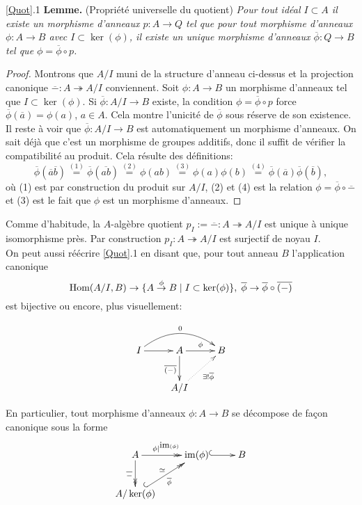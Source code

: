 \documentclass[a4paper, oneside, 12pt]{book}
\theoremstyle{definition} %
\DeclareMathOperator{\im}{im}
\begin{document}
 \ref{Quot}.1 \textbf{Lemme.} (Propriété universelle du quotient) \textit{Pour tout idéal $I\subset A$ il existe un morphisme d'anneaux $p:A\rightarrow Q$ tel  que pour tout  morphisme d'anneaux $\phi:A\rightarrow B$ avec $I\subset \ker(\phi)$, il  existe un unique morphisme d'anneaux $\overline{\phi}:Q\rightarrow B$ tel que $\phi=  \overline{\phi}\circ p$.}
 
 \begin{proof} Montrons que  $A/I$ muni de la structure d'anneau ci-dessus et la projection canonique $\overline{-}:A\twoheadrightarrow A/I$ conviennent. Soit $\phi:A\rightarrow B$  un morphisme d'anneaux tel que $I\subset \ker(\phi)$. Si 
 $\overline{\phi}:A/I\rightarrow B$ existe, la condition $\phi=  \overline{\phi}\circ p$ force $\overline{\phi}(\overline{a})=\phi(a)$, $a\in A$. Cela montre l'unicité de $\overline{\phi}$ sous réserve de son existence.   Il reste à voir que  $\overline{\phi}:A/I\rightarrow B$ est automatiquement un morphisme d'anneaux. On sait déjà que c'est un morphisme de groupes additifs, donc il suffit de vérifier la compatibilité au produit. Cela résulte des définitions: $$\overline{\phi}(\overline{a}\overline{b})\stackrel{(1)}{=}\overline{\phi}(\overline{a b})\stackrel{(2)}{=} \phi(ab)\stackrel{(3)}{=} \phi(a)\phi(b)\stackrel{(4)}{=}\overline{\phi}(\overline{a})\overline{\phi}(\overline{b}),$$
 où (1) est par construction du produit sur $A/I$, (2) et (4) est la relation  $\phi=  \overline{\phi}\circ \overline{-}$ et (3) est le fait que $\phi$ est un morphisme d'anneaux. \end{proof}
 
  Comme d'habitude, la $A$-algèbre quotient   $p_I:=\overline{-}:A\twoheadrightarrow A/I$ est unique à unique isomorphisme près.  Par construction $p_I: A\twoheadrightarrow A/I$ est surjectif de noyau $I$. \\
 
   On peut aussi réécrire \ref{Quot}.1 en disant que, pour tout anneau $B$ l'application  canonique 
$$\hbox{\rm Hom}(A/I,B)\rightarrow \lbrace A\stackrel{\phi}{\rightarrow}B\; |\; I\subset \ker(\phi)  \rbrace,\;\overline{\phi}\rightarrow \overline{\phi}\circ\overline{(-)}  $$
est bijective  ou encore, plus visuellement:

$$\xymatrix{I\ar[r]\ar@/^1.5pc/[rr]^{0}&A\ar[r]^{\phi}\ar[d]_{\overline{(-)}}&B\\
&A/I\ar@{.>}[ur]_{\exists ! \overline{\phi}}&}$$
  
   En particulier, tout  morphisme d'anneaux $\phi:A\rightarrow B$ se décompose de fa\c{c}on canonique sous la forme 
  $$\xymatrix{A\ar@{->>}[r]^{\phi|^{\hbox{\rm \small im}(\phi)}}\ar@{->>}[d]_{\overline{-}}&\im(\phi)\ar@{^{(}->}[r]&B\\
  A/\ker(\phi)\ar@{^{(}->>}[ur]^\simeq_{\overline{\phi}}&&}$$
  
\end{document}
